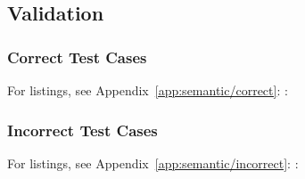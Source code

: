 \subsection{Validation}


\subsubsection{Correct Test Cases}

For listings, see Appendix~\ref{app:semantic/correct}: :



\subsubsection{Incorrect Test Cases}

For listings, see Appendix~\ref{app:semantic/incorrect}: :



%
